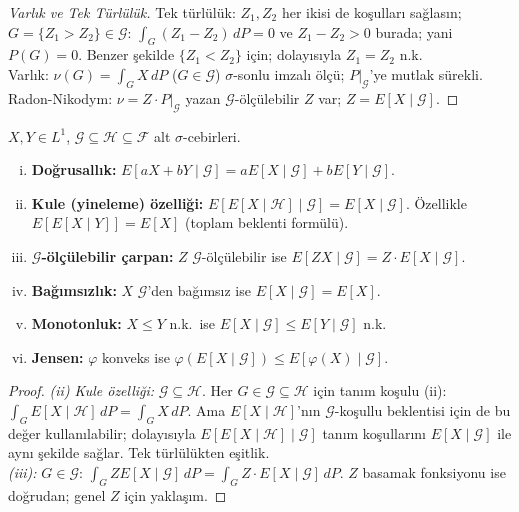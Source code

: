 \begin{proof}[Varlık ve Tek Türlülük]
Tek türlülük: $Z_1, Z_2$ her ikisi de koşulları sağlasın; $G = \{Z_1 > Z_2\} \in \mathcal{G}$:
$\int_G (Z_1 - Z_2) \, dP = 0$ ve $Z_1 - Z_2 > 0$ burada; yani $P(G) = 0$.
Benzer şekilde $\{Z_1 < Z_2\}$ için; dolayısıyla $Z_1 = Z_2$ n.k.\\
Varlık: $\nu(G) = \int_G X \, dP$ ($G \in \mathcal{G}$) $\sigma$-sonlu imzalı ölçü;
$P|_{\mathcal{G}}$'ye mutlak sürekli. Radon-Nikodym: $\nu = Z \cdot P|_{\mathcal{G}}$
yazan $\mathcal{G}$-ölçülebilir $Z$ var; $Z = E[X \mid \mathcal{G}]$.
\end{proof}

\begin{teorem}
\label{thm:kosullu_beklenti}
$X, Y \in L^1$, $\mathcal{G} \subseteq \mathcal{H} \subseteq \mathcal{F}$ alt $\sigma$-cebirleri.
\begin{enumerate}[(i)]
  \item \textbf{Doğrusallık:} $E[aX + bY \mid \mathcal{G}] = aE[X\mid\mathcal{G}] + bE[Y\mid\mathcal{G}]$.
  \item \textbf{Kule (yineleme) özelliği:} $E[E[X \mid \mathcal{H}] \mid \mathcal{G}] = E[X \mid \mathcal{G}]$.
        Özellikle $E[E[X \mid Y]] = E[X]$ (toplam beklenti formülü).
  \item \textbf{$\mathcal{G}$-ölçülebilir çarpan:} $Z$ $\mathcal{G}$-ölçülebilir ise
        $E[ZX \mid \mathcal{G}] = Z \cdot E[X \mid \mathcal{G}]$.
  \item \textbf{Bağımsızlık:} $X$ $\mathcal{G}$'den bağımsız ise $E[X \mid \mathcal{G}] = E[X]$.
  \item \textbf{Monotonluk:} $X \leq Y$ n.k.\ ise $E[X \mid \mathcal{G}] \leq E[Y \mid \mathcal{G}]$ n.k.
  \item \textbf{Jensen:} $\varphi$ konveks ise $\varphi(E[X \mid \mathcal{G}]) \leq E[\varphi(X) \mid \mathcal{G}]$.
\end{enumerate}
\end{teorem}

\begin{proof}
\textit{(ii) Kule özelliği:} $\mathcal{G} \subseteq \mathcal{H}$.
Her $G \in \mathcal{G} \subseteq \mathcal{H}$ için tanım koşulu (ii):
$\int_G E[X\mid\mathcal{H}] \, dP = \int_G X \, dP$.
Ama $E[X\mid\mathcal{H}]$'nın $\mathcal{G}$-koşullu beklentisi için de bu değer kullanılabilir;
dolayısıyla $E[E[X\mid\mathcal{H}]\mid\mathcal{G}]$ tanım koşullarını $E[X\mid\mathcal{G}]$ ile aynı şekilde sağlar.
Tek türlülükten eşitlik.\\
\textit{(iii):} $G \in \mathcal{G}$: $\int_G ZE[X\mid\mathcal{G}] \, dP = \int_G Z \cdot E[X\mid\mathcal{G}] \, dP$.
$Z$ basamak fonksiyonu ise doğrudan; genel $Z$ için yaklaşım.
\end{proof}

